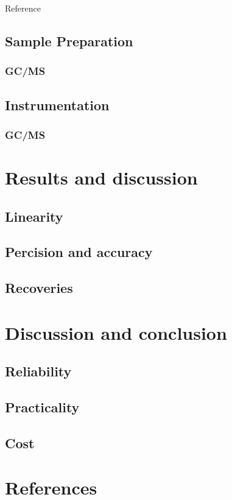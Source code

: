 \documentclass[journal=jacsat,manuscript=article]{achemso}
\begin{document}
Reference 



\subsection{Sample Preparation}
\subsubsection{GC/MS}
\subsection{Instrumentation}
\subsubsection{GC/MS}

\section{Results and discussion}
\subsection{Linearity}
\subsection{Percision and accuracy}
\subsection{Recoveries}

\section{Discussion and conclusion}
\subsection{Reliability}
\subsection{Practicality}
\subsection{Cost}




\section{References}
\end{document}
